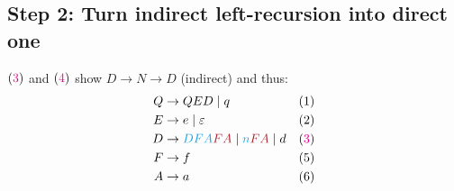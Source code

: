 \documentclass[10pt,a4paper,landscape]{article}
\begin{document}
\begin{multicols*}{3}
\section*{Step 2: Turn indirect left-recursion into direct one}
$(\mr{3})$ and $(\mr{4})$ show $ D\to N\to D$ (indirect) and thus:
\begin{align*}
  Q\to &\; QED \gor q & (1)\\
  E\to &\; e \gor \varepsilon &(2) \\
  D\to &\; \mb{DFA}\mo{FA} \gor \mb{n}\mo{FA} \gor d &(\mr{3})\\
  F\to &\; f          & (5)\\
  A\to &\; a          & (6)
\end{align*}

\end{multicols*}
\end{document}
